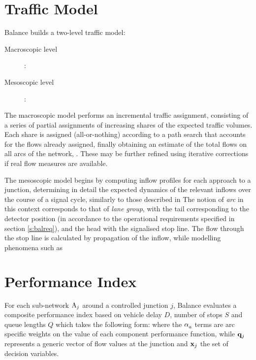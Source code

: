 \section{Traffic Model}
Balance builds a two-level traffic model:
\begin{description}
\item[Macroscopic level]: 
\item[Mesoscopic level]: 
\end{description}

The macroscopic model performs an incremental traffic assignment, consisting of a series of partial assignments of increasing shares of the expected traffic volumes. Each share is assigned (all-or-nothing) according to a path search that accounts for the flows already assigned, finally obtaining an estimate of the total flows on all arcs of the network, . These may be further refined using iterative corrections if real flow measures are available.


The mesoscopic model begins by computing inflow profiles for each approach to a junction, determining in detail the expected dynamics of the relevant inflows over the course of a signal cycle, similarly to those described in  The notion of \emph{arc} in this context corresponds to that of \emph{lane group}, with the tail corresponding to the detector position (in accordance to the operational requirements specified in section \ref{s:balreq}), and the head with the signalised stop line.
The flow through the stop line is calculated by propagation of the inflow, while modelling phenomena such as 



\section{Performance Index}
For each sub-network $\mathrm{A}_j$ around a controlled junction $j$, Balance evaluates a composite performance index based on vehicle delay $D$, number of stops $S$ and queue lengths $Q$ which takes the following form:
\newcommand{\qjxj}{\mathsmaller{\mathsmaller{(\flows{j},\controlvars{j})}}}
\eq[,]{e:balancepi}{
\balpi{j}\qjxj = \sum_{a \in \bstar{j}}
\weight{a}{D} D_a\qjxj \: + \:
\weight{a}{S} S_a\qjxj \: + \:
\weight{a}{Q} Q_a\qjxj
}
where the $\alpha_{a}^{\scriptscriptstyle{}}$ terms are arc specific weights on the value of each component performance function, while $\mathbf{q}_{j}$ represents a generic vector of flow values at the junction and $\mathbf{x}_{j}$ the set of decision variables. 

